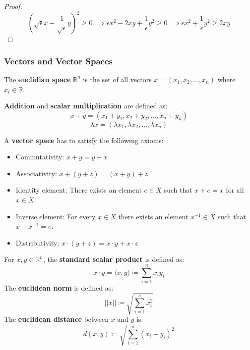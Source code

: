 \begin{proof}
    $$\left( \sqrt{\epsilon}x - \frac{1}{\sqrt{\epsilon}}y \right)^2 \geq 0 \implies \epsilon x^2 - 2xy + \frac{1}{\epsilon} y^2 \geq 0 \implies \epsilon x^2 + \frac{1}{\epsilon} y^2 \geq 2xy$$
\end{proof}

\subsubsection{Vectors and Vector Spaces}

\begin{definition}
    The \textbf{euclidian space} $\mathbb{R}^n$ is the set of all vectors $x = (x_1, x_2, \dots, x_n)$ where $x_i \in \mathbb{R}$.
\end{definition}

\begin{definition}
    \textbf{Addition} and \textbf{scalar multiplication} are defined as:
    $$x + y = (x_1 + y_1, x_2 + y_2, \dots, x_n + y_n)$$
    $$\lambda x = (\lambda x_1, \lambda x_2, \dots, \lambda x_n)$$
\end{definition}

\begin{definition}
    A \textbf{vector space} has to satisfy the following axioms:
    \begin{itemize}
        \item Commutativity: $x + y = y + x$
        \item Associativity: $x + (y + z) = (x + y) + z$
        \item Identity element: There exists an element $e \in X$ such that $x + e = x$ for all $x \in X$.
        \item Inverse element: For every $x \in X$ there exists an element $x^{-1} \in X$ such that $x + x^{-1} = e$.
        \item Distributivity: $x \cdot (y + z) = x \cdot y + x \cdot z$
    \end{itemize}
\end{definition}

\begin{definition}
    For $x, y \in \mathbb{R}^n$, the \textbf{standard scalar product} is defined as:
    $$x \cdot y = \langle x, y \rangle \coloneqq \sum_{i=1}^n x_i y_i$$
    The \textbf{euclidean norm} is defined as:
    $$||x|| \coloneqq \sqrt{\sum_{i=1}^n x_i^2}$$
    The \textbf{euclidean distance} between $x$ and $y$ is:
    $$d(x, y) \coloneqq \sqrt{\sum_{i=1}^n (x_i - y_i)^2}$$
\end{definition}


